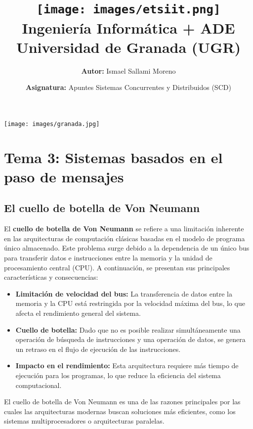 \documentclass[a4paper,12pt]{article}
\title{
    \vspace{-2cm}
    \texttt{[image: images/etsiit.png]} \\ %
    \LARGE Ingeniería Informática + ADE\\
    \large Universidad de Granada (UGR)\\[1cm]
}
\author{\textbf{Autor:} Ismael Sallami Moreno}
\date{\textbf{Asignatura:} Apuntes Sistemas Concurrentes y Distribuidos (SCD)\\[1cm]}
\begin{document}
\maketitle
\thispagestyle{empty}

\begin{center}
    \texttt{[image: images/granada.jpg]} \\ %
    \vfill
\end{center}

\newpage

\tableofcontents
\newpage

\section{Tema 3: Sistemas basados en el paso de mensajes}

\subsection{El cuello de botella de Von Neumann}

El \textbf{cuello de botella de Von Neumann} se refiere a una limitación inherente en las arquitecturas de computación clásicas basadas en el modelo de programa único almacenado. Este problema surge debido a la dependencia de un único bus para transferir datos e instrucciones entre la memoria y la unidad de procesamiento central (CPU). A continuación, se presentan sus principales características y consecuencias:

\begin{itemize}
    \item \textbf{Limitación de velocidad del bus:} La transferencia de datos entre la memoria y la CPU está restringida por la velocidad máxima del bus, lo que afecta el rendimiento general del sistema.
    \item \textbf{Cuello de botella:} Dado que no es posible realizar simultáneamente una operación de búsqueda de instrucciones y una operación de datos, se genera un retraso en el flujo de ejecución de las instrucciones.
    \item \textbf{Impacto en el rendimiento:} Esta arquitectura requiere más tiempo de ejecución para los programas, lo que reduce la eficiencia del sistema computacional.
\end{itemize}

El cuello de botella de Von Neumann es una de las razones principales por las cuales las arquitecturas modernas buscan soluciones más eficientes, como los sistemas multiprocesadores o arquitecturas paralelas.
\end{document}
